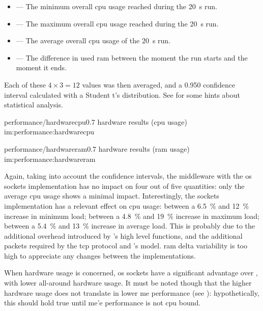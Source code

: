\begin{itemize}
	\item {} --- The minimum overall \gls{cpu} usage reached during the \SI{20}{\second} run.
	\item {} --- The maximum overall \gls{cpu} usage reached during the \SI{20}{\second} run.
	\item {} --- The average overall \gls{cpu} usage of the \SI{20}{\second} run.
	\item {} --- The difference in used \gls{ram} between the moment the run starts and the moment it ends.
\end{itemize}

\FLOATnoindent Each of these $4\times3=12$ values was then averaged, and a \num{0,950} confidence interval calculated with a Student t's distribution. See  for some hints about statistical analysis.

\begin{image}
	{performance/hardwarecpu}{0.7}
	{hardware results (\gls{cpu} usage)}
	{im:performance:hardwarecpu}
	{}
	{}
\end{image}

\begin{image}
	{performance/hardwareram}{0.7}
	{hardware results (\gls{ram} usage)}
	{im:performance:hardwareram}
	{}
	{}
\end{image}

Again, taking into account the confidence intervals, the \gls{middleware} with the \gls{os} sockets implementation has no impact on four out of five quantities: only the average \gls{cpu} usage shows a minimal impact. Interestingly, the  sockets implementation has a relevant effect on \gls{cpu} usage: between a \SI{6,5}{\percent} and \SI{12}{\percent} increase in minimum load; between a \SI{4,8}{\percent} and \SI{19}{\percent} increase in maximum load; between a \SI{5,4}{\percent} and \SI{13}{\percent} increase in average load. This is probably due to the additional overhead introduced by 's high level functions, and the additional packets required by the \gls{tcp} protocol and 's  model. \gls{ram} delta variability is too high to appreciate any changes between the implementations.

When hardware usage is concerned, \gls{os} sockets have a significant advantage over , with lower all-around hardware usage. It must be noted though that the higher hardware usage does not translate in lower \gls{me} performance (see ): hypothetically, this should hold true until \gls{me}'e performance is not \gls{cpu} bound.

